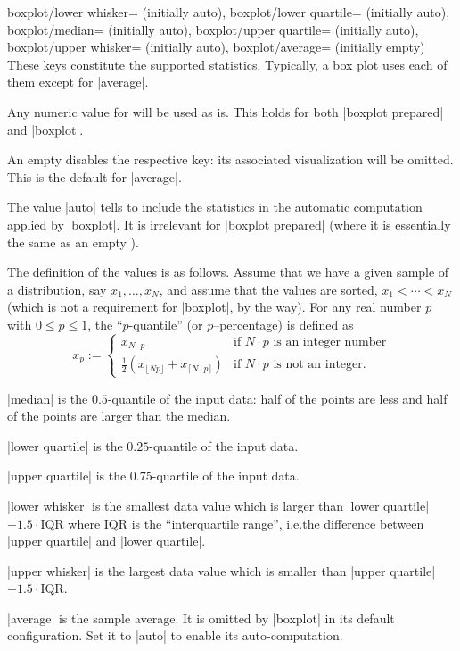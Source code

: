 \begin{pgfplotskeylist}{%
    boxplot/lower whisker= (initially auto),
    boxplot/lower quartile= (initially auto),
    boxplot/median= (initially auto),
    boxplot/upper quartile= (initially auto),
    boxplot/upper whisker= (initially auto),
    boxplot/average= (initially empty)%
}
    These keys constitute the supported statistics. Typically, a box plot uses
    each of them except for |average|.

    Any numeric value for  will be used as is. This holds for both
    |boxplot prepared| and |boxplot|.

    An empty  disables the respective key: its associated
    visualization will be omitted. This is the default for |average|.

    The value |auto| tells \PGFPlots{} to include the statistics in the
    automatic computation applied by |boxplot|. It is irrelevant for
    |boxplot prepared| (where it is essentially the same as an empty
    ).

    The definition of the values is as follows. Assume that we have a given
    sample of a distribution, say $x_1,\dotsc,x_N$, and assume that the values
    are sorted, $x_1 < \dotsb < x_N$ (which is not a requirement for |boxplot|,
    by the way). For any real number $p$ with $0\le p\le1$, the
    ``$p$-quantile'' (or $p$--percentage) is defined as
        \[
            x_p :=
                \begin{cases}
                     x_{N \cdot p}
                        & \text{if $N \cdot p$ is an integer number}\\
                    \frac{1}{2} (x_{\lfloor N p \rfloor} + x_{\lceil N \cdot p \rceil})
                        & \text{if $N \cdot p$ is not an integer.}
                \end{cases}
        \]

    |median| is the $0.5$-quantile of the input data: half of the points are
    less and half of the points are larger than the median.

    |lower quartile| is the $0.25$-quantile of the input data.

    |upper quartile| is the $0.75$-quartile of the input data.

    |lower whisker| is the smallest data value which is larger than
    |lower quartile|~$-1.5 \cdot \text{IQR}$ where $\text{IQR}$ is the
    ``interquartile range'', i.e.\@ the difference between |upper quartile| and
    |lower quartile|.

    |upper whisker| is the largest data value which is smaller than
    |upper quartile|~$+1.5 \cdot \text{IQR}$.

    |average| is the sample average. It is omitted by |boxplot| in its default
    configuration. Set it to |auto| to enable its auto-computation.
\end{pgfplotskeylist}

